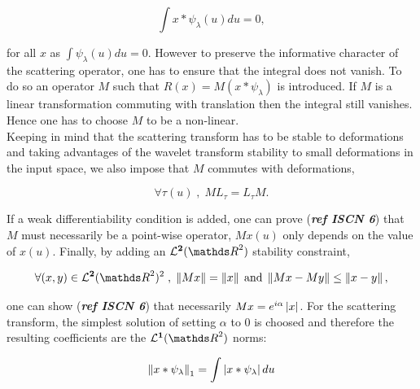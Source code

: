 \documentclass[a4paper,11pt]{report}
\begin{document}
{      \begin{equation*}
				\label{eq:Trivial invariant}
				\int x \ast \psi_{\lambda}(u)du = 0,
      \end{equation*}
      
      for all $x$ as $\int \psi_{\lambda}(u)du = 0$. However to preserve the informative character of the  scattering operator, one has to ensure that the integral does not vanish. To do so an operator $M$ such that $R(x) = M(x \ast \psi_{\lambda})$ is introduced. If $M$ is a linear  transformation commuting with translation then the integral still vanishes. Hence one has to choose $M$ to be a non-linear.\\
      
      Keeping in mind that the scattering transform has to be stable to deformations and taking advantages of the wavelet transform stability to small deformations in the input space, we also impose that $M$ commutes with deformations, 
      
      \begin{equation*}
				\label{eq:Commute with deformations}
				\forall \tau(u) \; , \; M L_{\tau} = L_{\tau} M.
      \end{equation*}
      
      If a weak differentiability condition is added, one can prove (\textbf{\textit{ref ISCN 6}}) that $M$ must necessarily be a point-wise operator, \ie $Mx(u)$ only depends on the value of $x(u)$. Finally, by adding an $\mathbf{\mathcal{L}^{2}}(\dsR^{2})$ stability constraint,
      
      \begin{equation*}
				\label{eq:L2 stability}
				\forall (x,y) \in \mathbf{\mathcal{L}^{2}}(\dsR^{2})^{2} \; , \; 
				\norm{Mx} = \norm{x} 
				\; \text{and} \;
				\norm{Mx-My} \leq \norm{x-y},
      \end{equation*}     
      
      one can show (\textbf{\textit{ref ISCN 6}}) that necessarily $Mx= e^{i\alpha}\left| x \right|$. For the scattering transform, the simplest solution of setting $\alpha$ to $0$ is choosed and therefore the resulting coefficients are the $\mathbf{\mathcal{L}^{1}}(\dsR^{2})$ norms:
       
      \begin{equation*}
				\label{eq:L1 norm}
				\left\lVert x \ast \psi_{\lambda} \right\rVert_{1} = \int \left| x \ast \psi_{\lambda} \right| du
      \end{equation*}      
      
}
\end{document}
